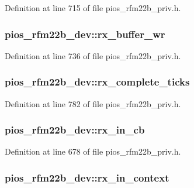 Definition at line 715 of file pios\-\_\-rfm22b\-\_\-priv.\-h.

\hypertarget{structpios__rfm22b__dev_aa31cc789855ee5b29487085603190aa3}{
\subsubsection[{rx\-\_\-buffer\-\_\-wr}]{ pios\-\_\-rfm22b\-\_\-dev\-::rx\-\_\-buffer\-\_\-wr}}\label{structpios__rfm22b__dev_aa31cc789855ee5b29487085603190aa3}


Definition at line 736 of file pios\-\_\-rfm22b\-\_\-priv.\-h.

\hypertarget{structpios__rfm22b__dev_a1a3dc2a287da24ec20da3daba8182266}{
\subsubsection[{rx\-\_\-complete\-\_\-ticks}]{ pios\-\_\-rfm22b\-\_\-dev\-::rx\-\_\-complete\-\_\-ticks}}\label{structpios__rfm22b__dev_a1a3dc2a287da24ec20da3daba8182266}


Definition at line 782 of file pios\-\_\-rfm22b\-\_\-priv.\-h.

\hypertarget{structpios__rfm22b__dev_ac170322ec2f96932e0f060aa68b6bd12}{
\subsubsection[{rx\-\_\-in\-\_\-cb}]{ pios\-\_\-rfm22b\-\_\-dev\-::rx\-\_\-in\-\_\-cb}}\label{structpios__rfm22b__dev_ac170322ec2f96932e0f060aa68b6bd12}


Definition at line 678 of file pios\-\_\-rfm22b\-\_\-priv.\-h.

\hypertarget{structpios__rfm22b__dev_a70fce9f445ae6ec87f5a559b89e82169}{
\subsubsection[{rx\-\_\-in\-\_\-context}]{ pios\-\_\-rfm22b\-\_\-dev\-::rx\-\_\-in\-\_\-context}}\label{structpios__rfm22b__dev_a70fce9f445ae6ec87f5a559b89e82169}


